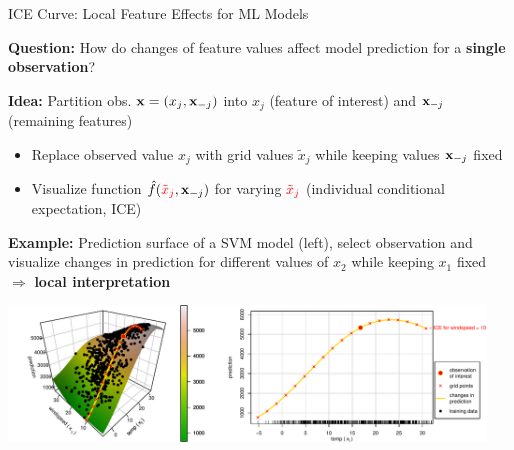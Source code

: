 \documentclass[11pt,compress,t,notes=noshow, aspectratio=169, xcolor=table,dvipsnames]{beamer}
\begin{document}
\begin{frame}{ICE Curve: Local Feature Effects for ML Models}

\textbf{Question:} How do changes of feature values affect model prediction for a \textbf{single observation}?



\textbf{Idea:} Partition obs. $\mathbf{x} = (x_j, \mathbf{x}_{-j})$ into $x_j$ (feature of interest) and $\mathbf{x}_{-j}$ (remaining features) 
\begin{itemize}
    \item Replace observed value $x_j$ with {\color{red} grid values $\tilde x_j$} while keeping values $\mathbf{x}_{-j}$ fixed
    \item Visualize function $\hat{f}({\color{red}\tilde x_j}, \mathbf{x}_{-j})$ for varying ${\color{red}\tilde x_j}$ (individual conditional expectation, ICE)%
\end{itemize}

\pause

\textbf{Example:} Prediction surface of a SVM model (left), select observation and visualize changes in prediction for different values of $x_2$ while keeping $x_1$ fixed $\Rightarrow$ \textbf{local interpretation}

\vfill
\centering
\includegraphics[width=0.95\textwidth, page = 1]{figure/ice_motivation_bike}

\end{frame}
\end{document}

